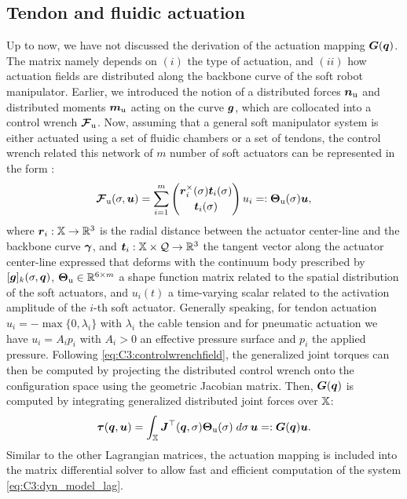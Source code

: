\subsection{Tendon and fluidic actuation}
Up to now, we have not discussed the derivation of the actuation mapping ${\boldsymbol{G}}({\boldsymbol{q}})$. The matrix namely depends on $(i)$ the type of actuation, and $(ii)$ how actuation fields are distributed along the backbone curve of the soft robot manipulator. Earlier, we introduced the notion of a distributed forces ${\boldsymbol{n}}_\textrm{u}$ and distributed moments ${\boldsymbol{m}}_\textrm{u}$ acting on the curve ${\boldsymbol{g}}$, which are collocated into a control wrench ${\boldsymbol{\mathcal{F}}}_{\textrm{u}}$. Now, assuming that a general soft manipulator system is either actuated using a set of fluidic chambers or a set of tendons, the control wrench related this network of $m$ number of soft actuators can be represented in the form \cite{Renda2020,Boyer2021}:
%
\begin{equation}
{\boldsymbol{\mathcal{F}}}_{\textrm{u}}(\sigma,{\boldsymbol{u}}) = \sum_{i = 1}^m \begin{pmatrix}
{\boldsymbol{r}}_i^\times(\sigma) {\boldsymbol{t}}_i(\sigma) \\[0.25em] {\boldsymbol{t}}_i (\sigma)
\end{pmatrix} u_i =: {\boldsymbol{\Theta}}_{\textrm{u}}(\sigma) {\boldsymbol{u}},
\label{eq:C3:controlwrenchfield}
\end{equation}
%
where ${\boldsymbol{r}}_i: \mathbb{X} \to \mathbb{R}^3$ is the radial distance between the actuator center-line and the backbone curve ${\boldsymbol{\gamma}}$, and ${\boldsymbol{t}}_i: \mathbb{X} \times \mathcal{Q} \to \mathbb{R}^3$ the tangent vector along the actuator center-line expressed that deforms with the continuum body prescribed by $[{\boldsymbol{g}}]_k(\sigma,{\boldsymbol{q}})$, ${\boldsymbol{\Theta}}_\textrm{u} \in \mathbb{R}^{6 \times m}$ a shape function matrix related to the spatial distribution of the soft actuators, and $u_i(t)$ a time-varying scalar related to the activation amplitude of the $i$-th soft actuator. Generally speaking, for tendon actuation $u_i = -\max\{0,\lambda_i\}$ with $\lambda_i$ the cable tension and for pneumatic actuation we have $u_i = A_i p_i$ with $A_i > 0$ an effective pressure surface and $p_i$ the applied pressure. Following \eqref{eq:C3:controlwrenchfield}, the generalized joint torques can then be computed by projecting the distributed control wrench onto the configuration space using the geometric Jacobian matrix. Then, ${\boldsymbol{G}}({\boldsymbol{q}})$ is computed by integrating generalized distributed joint forces over $\mathbb{X}$:
%
\begin{equation}
\boldsymbol{\tau}({\boldsymbol{q}},{\boldsymbol{u}}) = \int_{\mathbb{X}} {\boldsymbol{J}}^\top({\boldsymbol{q}},\sigma) {\boldsymbol{\Theta}}_{\textrm{u}}(\sigma)\; d\sigma \,{\boldsymbol{u}} =: {\boldsymbol{G}}({\boldsymbol{q}}) {\boldsymbol{u}}.
\end{equation}
%
Similar to the other Lagrangian matrices, the actuation mapping is included into the matrix differential solver to allow fast and efficient computation of the system \eqref{eq:C3:dyn_model_lag}.

